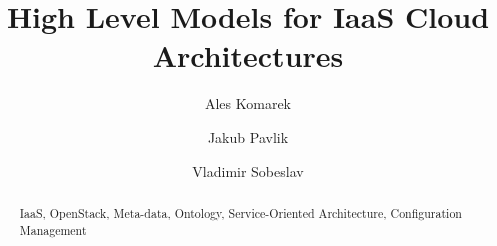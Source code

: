 \documentclass[runningheads,a4paper]{llncs}
\newcommand{\keywords}[1]{\par\addvspace\baselineskip
\noindent\keywordname\enspace\ignorespaces#1}
\begin{document}
\mainmatter  %

\title{High Level Models for IaaS Cloud Architectures}


%
%
\author{Ales Komarek\and Jakub Pavlik\and Vladimir Sobeslav}
%


\institute{Faculty of Informatics and Management, University of Hradec Kralove,\\
Rokitanskeho 62, Hradec Kralove, Czech Republic\\
\mailsa\\
}
%
%

\maketitle

\begin{abstract}

\keywords{IaaS, OpenStack, Meta-data, Ontology, Service-Oriented Architecture, Configuration Management}

\end{abstract}



%




\begin{thebibliography}{5}



\end{thebibliography}
\end{document}

